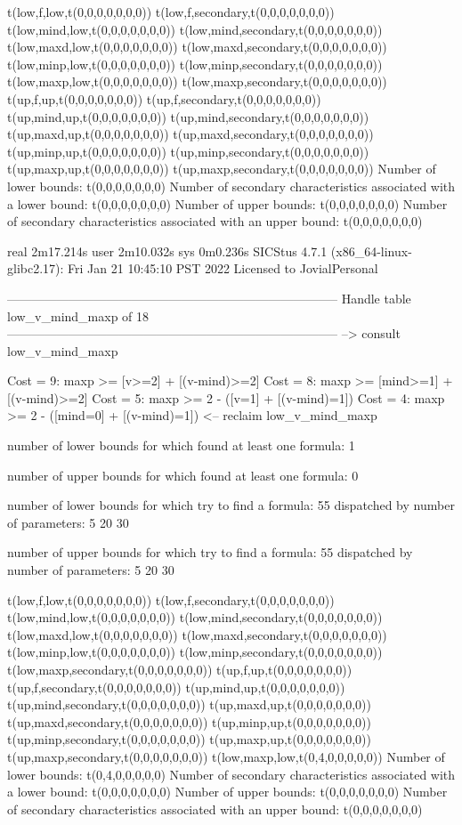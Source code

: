 t(low,f,low,t(0,0,0,0,0,0,0))
t(low,f,secondary,t(0,0,0,0,0,0,0))
t(low,mind,low,t(0,0,0,0,0,0,0))
t(low,mind,secondary,t(0,0,0,0,0,0,0))
t(low,maxd,low,t(0,0,0,0,0,0,0))
t(low,maxd,secondary,t(0,0,0,0,0,0,0))
t(low,minp,low,t(0,0,0,0,0,0,0))
t(low,minp,secondary,t(0,0,0,0,0,0,0))
t(low,maxp,low,t(0,0,0,0,0,0,0))
t(low,maxp,secondary,t(0,0,0,0,0,0,0))
t(up,f,up,t(0,0,0,0,0,0,0))
t(up,f,secondary,t(0,0,0,0,0,0,0))
t(up,mind,up,t(0,0,0,0,0,0,0))
t(up,mind,secondary,t(0,0,0,0,0,0,0))
t(up,maxd,up,t(0,0,0,0,0,0,0))
t(up,maxd,secondary,t(0,0,0,0,0,0,0))
t(up,minp,up,t(0,0,0,0,0,0,0))
t(up,minp,secondary,t(0,0,0,0,0,0,0))
t(up,maxp,up,t(0,0,0,0,0,0,0))
t(up,maxp,secondary,t(0,0,0,0,0,0,0))
Number of lower bounds:                                             t(0,0,0,0,0,0,0)
Number of secondary characteristics associated with a lower bound:  t(0,0,0,0,0,0,0)
Number of upper bounds:                                             t(0,0,0,0,0,0,0)
Number of secondary characteristics associated with an upper bound: t(0,0,0,0,0,0,0)

real	2m17.214s
user	2m10.032s
sys	0m0.236s
SICStus 4.7.1 (x86_64-linux-glibc2.17): Fri Jan 21 10:45:10 PST 2022
Licensed to JovialPersonal


--------------------------------------------------------------------------------
Handle table low_v_mind_maxp of 18
--------------------------------------------------------------------------------
--> consult low_v_mind_maxp

Cost =  9:  maxp >= [v>=2] + [(v-mind)>=2]
Cost =  8:  maxp >= [mind>=1] + [(v-mind)>=2]
Cost =  5:  maxp >= 2 - ([v=1] + [(v-mind)=1])
Cost =  4:  maxp >= 2 - ([mind=0] + [(v-mind)=1])
<-- reclaim low_v_mind_maxp

number of lower bounds for which found at least one formula: 1

number of upper bounds for which found at least one formula: 0

number of lower bounds for which try to find a formula: 55
dispatched by number of parameters: 5  20  30

number of upper bounds for which try to find a formula: 55
dispatched by number of parameters: 5  20  30

t(low,f,low,t(0,0,0,0,0,0,0))
t(low,f,secondary,t(0,0,0,0,0,0,0))
t(low,mind,low,t(0,0,0,0,0,0,0))
t(low,mind,secondary,t(0,0,0,0,0,0,0))
t(low,maxd,low,t(0,0,0,0,0,0,0))
t(low,maxd,secondary,t(0,0,0,0,0,0,0))
t(low,minp,low,t(0,0,0,0,0,0,0))
t(low,minp,secondary,t(0,0,0,0,0,0,0))
t(low,maxp,secondary,t(0,0,0,0,0,0,0))
t(up,f,up,t(0,0,0,0,0,0,0))
t(up,f,secondary,t(0,0,0,0,0,0,0))
t(up,mind,up,t(0,0,0,0,0,0,0))
t(up,mind,secondary,t(0,0,0,0,0,0,0))
t(up,maxd,up,t(0,0,0,0,0,0,0))
t(up,maxd,secondary,t(0,0,0,0,0,0,0))
t(up,minp,up,t(0,0,0,0,0,0,0))
t(up,minp,secondary,t(0,0,0,0,0,0,0))
t(up,maxp,up,t(0,0,0,0,0,0,0))
t(up,maxp,secondary,t(0,0,0,0,0,0,0))
t(low,maxp,low,t(0,4,0,0,0,0,0))
Number of lower bounds:                                             t(0,4,0,0,0,0,0)
Number of secondary characteristics associated with a lower bound:  t(0,0,0,0,0,0,0)
Number of upper bounds:                                             t(0,0,0,0,0,0,0)
Number of secondary characteristics associated with an upper bound: t(0,0,0,0,0,0,0)

